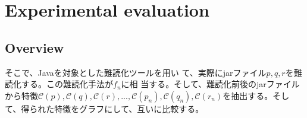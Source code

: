 \documentclass[conference]{IEEEtran}
\newcommand{\birth}[1]{\mathcal{C}(#1)}
\begin{document}
% 
% 
% 
% 
% 
% 
% 
%

\section{Experimental evaluation}
\subsection{Overview}


そこで、Javaを対象とした難読化ツールを用い
て、実際にjarファイル$p, q, r$を難読化する。この難読化手法が$f_n$に相
当する。そして、難読化前後のjarファイルから特徴$\birth{p}, \birth{q},
\birth{r}, ..., \birth{p_n}, \birth{q_n}, \birth{r_n}$を抽出する。そし
て、得られた特徴をグラフにして、互いに比較する。
\end{document}
